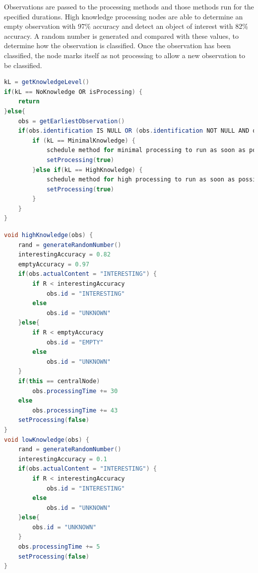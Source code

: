 Observations are passed to the processing methods and those methods run for the specified durations. High knowledge processing nodes are able to determine an empty observation with 97\% accuracy and detect an object of interest with 82\% accuracy. A random number is generated and compared with these values, to determine how the observation is classified. Once the observation has been classified, the node marks itself as not processing to allow a new observation to be classified. 

\begin{minipage}{\linewidth}
\begin{lstlisting}[breaklines=true, caption={Processing Function for DA and DP Nodes}, label={alg:sim:proc}, language=java]
kL = getKnowledgeLevel()
if(kL == NoKnowledge OR isProcessing) {
	return
}else{
	obs = getEarliestObservation()
	if(obs.identification IS NULL OR (obs.identification NOT NULL AND obs.identifiedBy.getKnowledgeLevel() < kL)) {
		if (kL == MinimalKnowledge) {
			schedule method for minimal processing to run as soon as possible for 5 ticks
			setProcessing(true)
		}else if(kL == HighKnowledge) {
			schedule method for high processing to run as soon as possible for 43 ticks
			setProcessing(true)
		}
	}
}
\end{lstlisting}
\end{minipage}

\vfill

\begin{minipage}{\linewidth}
\begin{lstlisting}[breaklines=true, caption={Processing Functions for Nodes}, label={alg:sim:know}, language=java]
void highKnowledge(obs) {
	rand = generateRandomNumber()
	interestingAccuracy = 0.82
	emptyAccuracy = 0.97
	if(obs.actualContent = "INTERESTING") {
		if R < interestingAccuracy
			obs.id = "INTERESTING"
		else
			obs.id = "UNKNOWN"
	}else{
		if R < emptyAccuracy
			obs.id = "EMPTY"
		else
			obs.id = "UNKNOWN"
	}
	if(this == centralNode)
		obs.processingTime += 30
	else
		obs.processingTime += 43
	setProcessing(false)
}
void lowKnowledge(obs) {
	rand = generateRandomNumber()
	interestingAccuracy = 0.1
	if(obs.actualContent = "INTERESTING") {
		if R < interestingAccuracy
			obs.id = "INTERESTING"
		else
			obs.id = "UNKNOWN"
	}else{
		obs.id = "UNKNOWN"
	}
	obs.processingTime += 5
	setProcessing(false)
}

\end{lstlisting}
\end{minipage}

